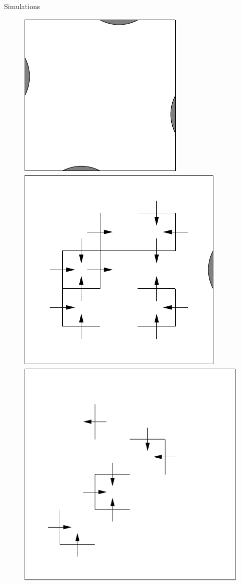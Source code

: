 	\begin{frame}[fragile]{Simulations}
		\begin{figure}
			\begin{center}
				\includegraphics[scale=0.70]{"../images/4-TV.pdf"}
				\includegraphics[scale=0.70]{"../images/1-TV.pdf"}
				\includegraphics[scale=0.70]{"../images/No-TV.pdf"}

\end{center}
\end{figure}
\end{frame}

